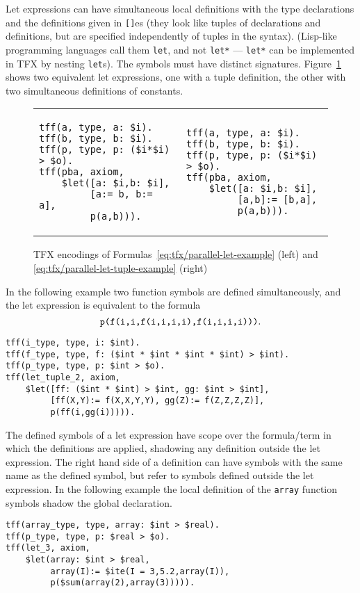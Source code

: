 Let expressions can have simultaneous local definitions
with the type declarations and the definitions given in {\tt []}es
(they look like tuples of declarations and definitions, but are
specified independently of tuples in the syntax).
(Lisp-like programming languages call them \verb'let', and 
not \verb'let*' --- \verb'let*' can be implemented in TFX by nesting
\verb'let's).
The symbols must have distinct signatures.
Figure~\ref{fig:tfx/pba-tfx} shows two equivalent let expressions, one with a tuple definition, the other with two simultaneous definitions of constants.
\begin{figure}[htbp]
\begin{tabular}[t]{ll}
\begin{minipage}{0.46\textwidth}
\begin{verbatim}
tff(a, type, a: $i).
tff(b, type, b: $i).
tff(p, type, p: ($i*$i) > $o).
tff(pba, axiom,
    $let([a: $i,b: $i],
         [a:= b, b:= a],
         p(a,b))).
\end{verbatim}
\end{minipage}
    &
\begin{minipage}{0.5\textwidth}
\begin{verbatim}
tff(a, type, a: $i).
tff(b, type, b: $i).
tff(p, type, p: ($i*$i) > $o).
tff(pba, axiom,
    $let([a: $i,b: $i],
         [a,b]:= [b,a],
         p(a,b))).
\end{verbatim}
\end{minipage}
\\
\end{tabular}
\caption{TFX encodings of Formulas~\ref{eq:tfx/parallel-let-example} (left) and \ref{eq:tfx/parallel-let-tuple-example} (right)}
\label{fig:tfx/pba-tfx}
\end{figure}

In the following example two function symbols are defined simultaneously, and the let expression is equivalent to the formula $$\text{\texttt{p(f(i,i,f(i,i,i,i),f(i,i,i,i)))}}.$$
\begin{verbatim}
tff(i_type, type, i: $int).
tff(f_type, type, f: ($int * $int * $int * $int) > $int).
tff(p_type, type, p: $int > $o).
tff(let_tuple_2, axiom,
    $let([ff: ($int * $int) > $int, gg: $int > $int],
         [ff(X,Y):= f(X,X,Y,Y), gg(Z):= f(Z,Z,Z,Z)],
         p(ff(i,gg(i))))).
\end{verbatim}

The defined symbols of a let expression have scope over the formula/term in 
which the definitions are applied, shadowing any definition outside the let 
expression. 
The right hand side of a definition can have symbols with the same name as 
the defined symbol, but refer to symbols defined outside the let expression. 
In the following example the local definition of the {\tt array} function 
symbols shadow the global declaration.
\begin{verbatim}
tff(array_type, type, array: $int > $real).
tff(p_type, type, p: $real > $o).
tff(let_3, axiom,
    $let(array: $int > $real,
         array(I):= $ite(I = 3,5.2,array(I)),
         p($sum(array(2),array(3))))).
\end{verbatim}

